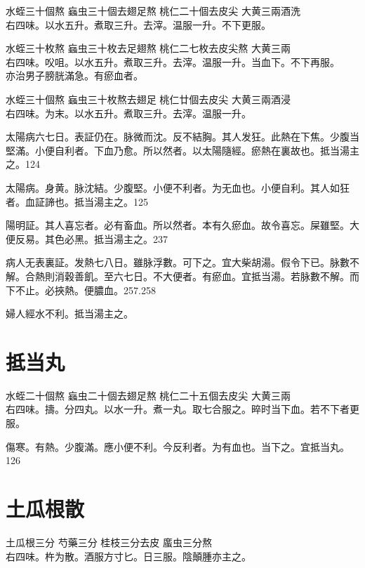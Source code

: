 水蛭{\scriptsize 三十個熬} 蝱虫{\scriptsize 三十個去翅足熬} 桃仁{\scriptsize 二十個去皮尖} 大黄{\scriptsize 三兩酒洗}\\
右四味。以水五升。煮取三升。去滓。温服一升。不下更服。{\zhaoben}

水蛭{\scriptsize 三十枚熬} 蝱虫{\scriptsize 三十枚去足翅熬} 桃仁{\scriptsize 二七枚去皮尖熬} 大黄{\scriptsize 三兩}\\
右四味。㕮咀。以水五升。煮取三升。去滓。温服一升。当血下。不下再服。\\
亦治男子膀胱滿急。有瘀血者。{\wuben}

水蛭{\scriptsize 三十個熬} 蝱虫{\scriptsize 三十枚熬去翅足} 桃仁{\scriptsize 廿個去皮尖} 大黄{\scriptsize 三兩酒浸}\\
右四味。为末。以水五升。煮取三升。去滓。温服一升。{\dengben}

太陽病六七日。表証仍在。脉微而沈。反不結胸。其人发狂。此熱在下焦。少腹当堅滿。小便自利者。下血乃愈。所以然者。以太陽隨經。瘀熱在裏故也。抵当湯主之。124

太陽病。身黄。脉沈結。少腹堅。小便不利者。为无血也。小便自利。其人如狂者。血証諦也。抵当湯主之。125

陽明証。其人喜忘者。必有畜血。所以然者。本有久瘀血。故令喜忘。屎雖堅。大便反易。其色必黑。抵当湯主之。237

病人无表裏証。发熱七八日。雖脉浮數。可下之。{\khaaitp 宜大柴胡湯。}假令下已。脉數不解。合熱則消穀善飢。至六七日。不大便者。有瘀血。宜抵当湯。若脉數不解。而下不止。必挾熱。便膿血。257.258

婦人經水不利。抵当湯主之。

\section{抵当丸}

水蛭{\scriptsize 二十個熬} 蝱虫{\scriptsize 二十個去翅足熬} 桃仁{\scriptsize 二十五個去皮尖} 大黄{\scriptsize 三兩}\\
右四味。擣。分四丸。以水一升。煮一丸。取七合服之。晬时当下血。若不下者更服。

傷寒。有熱。少腹滿。應小便不利。今反利者。为有血也。当下之。宜抵当丸。126

\section{土瓜根散}

土瓜根{\scriptsize 三分} 芍藥{\scriptsize 三分} 桂枝{\scriptsize 三分去皮} 䗪虫{\scriptsize 三分熬}\\
右四味。杵为散。酒服方寸匕。日三服。{\khaaitp 陰顛腫亦主之。}

